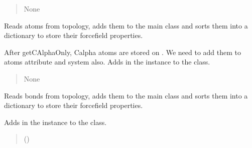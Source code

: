 \documentclass[letterpaper,10pt,english]{sphinxmanual}
\begin{document}
\begin{fulllineitems}
\begin{fulllineitems}
\begin{quote}
\begin{description}
\begin{itemize}
\end{itemize}

\sphinxAtStartPar
None

\end{description}\end{quote}

\end{fulllineitems}


\begin{fulllineitems}
\label{\detokenize{modules/system:hps.core.system.getAtoms}}
\pysigstartsignatures
{}
\pysigstopsignatures
\sphinxAtStartPar
Reads atoms from topology, adds them to the main class and sorts them
into a dictionary to store their forcefield properties.

\sphinxAtStartPar
After getCAlphaOnly, C\sphinxhyphen{}alpha atoms are stored on .
We need to add them to atoms attribute and system also.
Adds  in the  instance to the  class.
\begin{quote}\begin{description}
\sphinxAtStartPar
None

\end{description}\end{quote}

\end{fulllineitems}


\begin{fulllineitems}
\label{\detokenize{modules/system:hps.core.system.getBonds}}
\pysigstartsignatures
{}
\pysigstopsignatures
\sphinxAtStartPar
Reads bonds from topology, adds them to the main class and sorts them
into a dictionary to store their forcefield properties.

\sphinxAtStartPar
Adds  in the  instance to the  class.
\begin{quote}\begin{description}
\sphinxAtStartPar
{} (\sphinxstyleliteralemphasis{\sphinxupquote{ {[}}}\sphinxstyleliteralemphasis{\sphinxupquote{{]}}}) \textendash{} 


\end{description}
\end{quote}
\end{fulllineitems}
\end{fulllineitems}
\end{document}
